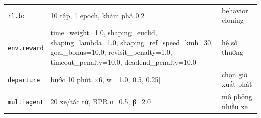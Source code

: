 \begin{table}[!htbp]
\begin{tabularx}{\linewidth}{lXl}
\texttt{rl.bc} & 10 tập, 1 epoch, khám phá 0.2 & behavior cloning \\
\texttt{env.reward} & time\_weight=1.0, shaping=euclid, shaping\_lambda=1.0, shaping\_ref\_speed\_kmh=30, goal\_bonus=10.0, revisit\_penalty=1.0, timeout\_penalty=10.0, deadend\_penalty=10.0 & hệ số thưởng \\
\texttt{departure} & bước 10 phút ×6, w=[1.0, 0.5, 0.25] & chọn giờ xuất phát \\
\texttt{multiagent} & 20 xe/tác tử, BPR α=0.5, β=2.0 & mô phỏng nhiều xe \\
\bottomrule
\end{tabularx}
\end{table}
